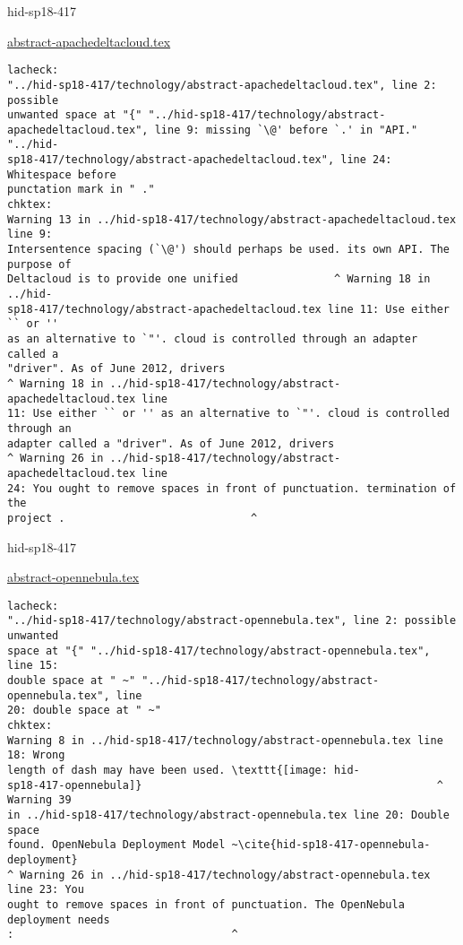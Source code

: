 \begin{IU}

hid-sp18-417

\href{https://github.com/cloudmesh-community/hid-sp18-417/blob/master//technology/abstract-apachedeltacloud.tex}{abstract-apachedeltacloud.tex}

\begin{tiny}
\begin{verbatim}
lacheck:
"../hid-sp18-417/technology/abstract-apachedeltacloud.tex", line 2: possible
unwanted space at "{" "../hid-sp18-417/technology/abstract-
apachedeltacloud.tex", line 9: missing `\@' before `.' in "API." "../hid-
sp18-417/technology/abstract-apachedeltacloud.tex", line 24: Whitespace before
punctation mark in " ."
chktex:
Warning 13 in ../hid-sp18-417/technology/abstract-apachedeltacloud.tex line 9:
Intersentence spacing (`\@') should perhaps be used. its own API. The purpose of
Deltacloud is to provide one unified               ^ Warning 18 in ../hid-
sp18-417/technology/abstract-apachedeltacloud.tex line 11: Use either `` or ''
as an alternative to `"'. cloud is controlled through an adapter called a
"driver". As of June 2012, drivers
^ Warning 18 in ../hid-sp18-417/technology/abstract-apachedeltacloud.tex line
11: Use either `` or '' as an alternative to `"'. cloud is controlled through an
adapter called a "driver". As of June 2012, drivers
^ Warning 26 in ../hid-sp18-417/technology/abstract-apachedeltacloud.tex line
24: You ought to remove spaces in front of punctuation. termination of the
project .                             ^
\end{verbatim}
\end{tiny}
\end{IU}



\begin{IU}

hid-sp18-417

\href{https://github.com/cloudmesh-community/hid-sp18-417/blob/master//technology/abstract-opennebula.tex}{abstract-opennebula.tex}

\begin{tiny}
\begin{verbatim}
lacheck:
"../hid-sp18-417/technology/abstract-opennebula.tex", line 2: possible unwanted
space at "{" "../hid-sp18-417/technology/abstract-opennebula.tex", line 15:
double space at " ~" "../hid-sp18-417/technology/abstract-opennebula.tex", line
20: double space at " ~"
chktex:
Warning 8 in ../hid-sp18-417/technology/abstract-opennebula.tex line 18: Wrong
length of dash may have been used. \texttt{[image: hid-
sp18-417-opennebula]}                                              ^ Warning 39
in ../hid-sp18-417/technology/abstract-opennebula.tex line 20: Double space
found. OpenNebula Deployment Model ~\cite{hid-sp18-417-opennebula-deployment}
^ Warning 26 in ../hid-sp18-417/technology/abstract-opennebula.tex line 23: You
ought to remove spaces in front of punctuation. The OpenNebula deployment needs
:                                  ^
\end{verbatim}
\end{tiny}
\end{IU}

